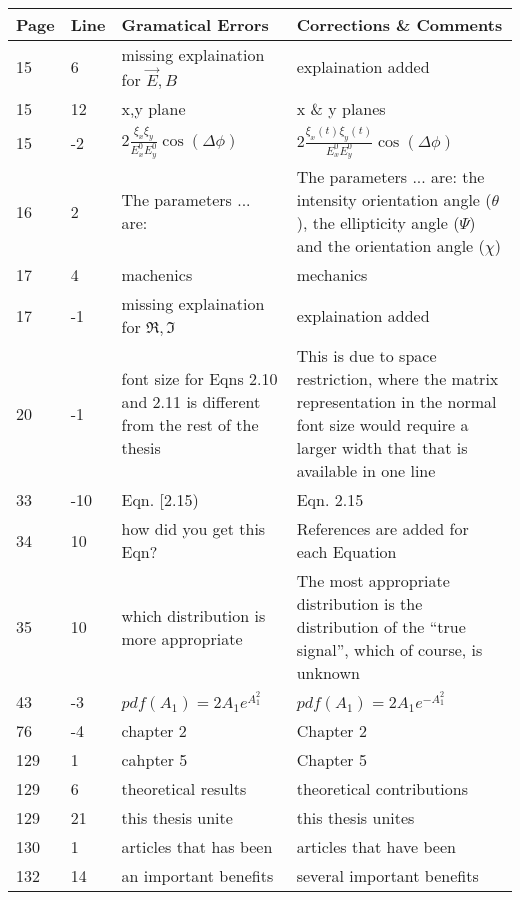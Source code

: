 \noindent
\begin{longtable}[c]{p{}|p{}|p{}|p{}}
\textbf{Page} & \textbf{Line} & \textbf{Gramatical Errors} & \textbf{Corrections \& Comments} \\
 \hline
 \endhead
15 & 6 & missing explaination for $\vec{E},B$ & explaination added \\
15 & 12 & x,y plane & x \& y planes \\
15 & -2 & $2 \frac{\xi_x \xi_y}{E_x^0 E_y^0} \cos (\Delta \phi)$ & $2 \frac{\xi_x(t) \xi_y(t)}{E_x^0 E_y^0} \cos (\Delta \phi)$ \\
16 & 2 & The parameters ... are: & The parameters ... are: the intensity orientation angle ($\theta$), the ellipticity angle ($\Psi$) and the orientation angle ($\chi$) \\
17 & 4 & machenics & mechanics \\
17 & -1 & missing explaination for $\Re,\Im$ & explaination added \\
20 & -1 & font size for Eqns 2.10 and 2.11 is different from the rest of the thesis & This is due to space restriction, where the matrix representation in the normal font size would require a larger width that that is available in one line \\
33 & -10 & Eqn. [2.15) & Eqn. 2.15 \\
34 & 10 & how did you get this Eqn? & References are added for each Equation \\
35 & 10 & which distribution is more appropriate & The most appropriate distribution is the distribution of the ``true signal'', which of course, is unknown \\
43 & -3 & $pdf(A_1)=2A_1e^{A_1^2}$ & $pdf(A_1)=2A_1e^{-A_1^2}$ \\
76 & -4 & chapter 2 & Chapter 2 \\
129 & 1 & cahpter 5 & Chapter 5 \\
129 & 6 & theoretical results & theoretical contributions \\
129 & 21 & this thesis unite & this thesis unites \\
130 & 1 & articles that has been & articles that have been \\
132 & 14 & an important benefits & several important benefits \\
\end{longtable}    

